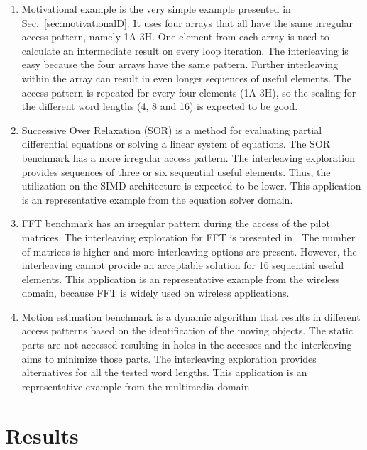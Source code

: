 \begin{enumerate}
\item Motivational example is the very simple example presented in Sec.~\ref{sec:motivationalD}. 
It uses four arrays that all have the same irregular access pattern, namely 1A-3H.
One element from each array is used to calculate an intermediate result on every loop iteration.
The interleaving is easy because the four arrays have the same pattern.
Further interleaving within the array can result in even longer sequences of useful elements.
The access pattern is repeated for every four elements (1A-3H), so the scaling for the different word lengths (4, 8 and 16) is expected to be good. 
\item Successive Over Relaxation (SOR) is a method for evaluating partial differential equations or solving a linear system of equations.
The SOR benchmark has a more irregular access pattern.
The interleaving exploration provides sequences of three or six sequential useful elements.
Thus, the utilization on the SIMD architecture is expected to be lower.
This application is an representative example from the equation solver domain.
\item FFT benchmark has an irregular pattern during the access of the pilot matrices. 
The interleaving exploration for FFT is presented in \cite{sharma2013data}.
The number of matrices is higher and more interleaving options are present.
However, the interleaving cannot provide an acceptable solution for 16 sequential useful elements.
This application is an representative example from the wireless domain, because FFT is widely used on wireless applications.
\item Motion estimation benchmark is a dynamic algorithm that results in different access patterns based on the identification of the moving objects. 
The static parts are not accessed resulting in holes in the accesses and the interleaving aims to minimize those parts.
The interleaving exploration provides alternatives for all the  tested word lengths. 
This application is an representative example from the multimedia domain.
\end{enumerate}

\section{Results}
\label{sec:resultsD}


